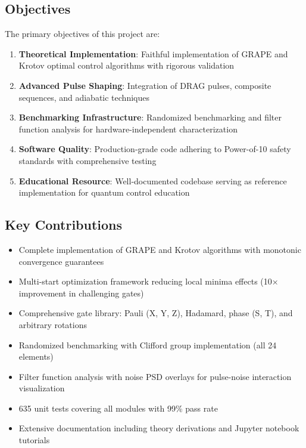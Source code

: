 \documentclass[11pt,a4paper]{article}
\theoremstyle{definition}
\theoremstyle{remark}
\begin{document}
\subsection{Objectives}

The primary objectives of this project are:

\begin{enumerate}
    \item \textbf{Theoretical Implementation}: Faithful implementation of GRAPE and Krotov optimal control algorithms with rigorous validation
    \item \textbf{Advanced Pulse Shaping}: Integration of DRAG pulses, composite sequences, and adiabatic techniques
    \item \textbf{Benchmarking Infrastructure}: Randomized benchmarking and filter function analysis for hardware-independent characterization
    \item \textbf{Software Quality}: Production-grade code adhering to Power-of-10 safety standards with comprehensive testing
    \item \textbf{Educational Resource}: Well-documented codebase serving as reference implementation for quantum control education
\end{enumerate}

\subsection{Key Contributions}

\begin{itemize}
    \item Complete implementation of GRAPE and Krotov algorithms with monotonic convergence guarantees
    \item Multi-start optimization framework reducing local minima effects (10× improvement in challenging gates)
    \item Comprehensive gate library: Pauli (X, Y, Z), Hadamard, phase (S, T), and arbitrary rotations
    \item Randomized benchmarking with Clifford group implementation (all 24 elements)
    \item Filter function analysis with noise PSD overlays for pulse-noise interaction visualization
    \item 635 unit tests covering all modules with 99\% pass rate
    \item Extensive documentation including theory derivations and Jupyter notebook tutorials
\end{itemize}
\end{document}
